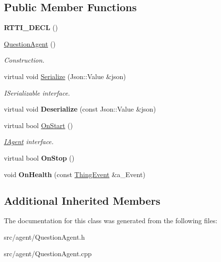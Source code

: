 \subsection*{Public Member Functions}
\begin{DoxyCompactItemize}
\item 
\mbox{\label{class_question_agent_a60d302a5b8eca0cb93734b288d5d50e8}} 
{\bfseries R\+T\+T\+I\+\_\+\+D\+E\+CL} ()
\item 
\mbox{\label{class_question_agent_a33a8067c4402914f28d6549a094af818}} 
\hyperlink{class_question_agent_a33a8067c4402914f28d6549a094af818}{Question\+Agent} ()
\begin{DoxyCompactList}\small\item\em Construction. \end{DoxyCompactList}\item 
\mbox{\label{class_question_agent_a928ebfd95a09fb60c0cd5c3ff842c5c6}} 
virtual void \hyperlink{class_question_agent_a928ebfd95a09fb60c0cd5c3ff842c5c6}{Serialize} (Json\+::\+Value \&json)
\begin{DoxyCompactList}\small\item\em I\+Serializable interface. \end{DoxyCompactList}\item 
\mbox{\label{class_question_agent_a2626966d4e71567e2e2261860ce60355}} 
virtual void {\bfseries Deserialize} (const Json\+::\+Value \&json)
\item 
\mbox{\label{class_question_agent_afd4e56c31fadf54094930797a6be22c3}} 
virtual bool \hyperlink{class_question_agent_afd4e56c31fadf54094930797a6be22c3}{On\+Start} ()
\begin{DoxyCompactList}\small\item\em \hyperlink{class_i_agent}{I\+Agent} interface. \end{DoxyCompactList}\item 
\mbox{\label{class_question_agent_a598fd41da35abac5f317a1a09551f864}} 
virtual bool {\bfseries On\+Stop} ()
\item 
\mbox{\label{class_question_agent_aa9b291b405a08081a90f2e41a4389487}} 
void {\bfseries On\+Health} (const \hyperlink{class_thing_event}{Thing\+Event} \&a\+\_\+\+Event)
\end{DoxyCompactItemize}
\subsection*{Additional Inherited Members}


The documentation for this class was generated from the following files\+:\begin{DoxyCompactItemize}
\item 
src/agent/Question\+Agent.\+h\item 
src/agent/Question\+Agent.\+cpp\end{DoxyCompactItemize}
